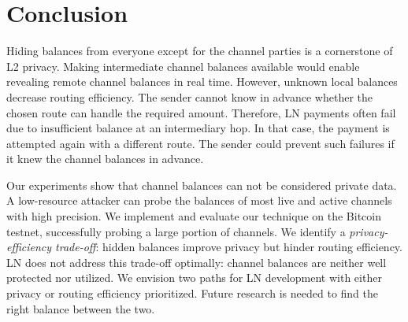 \section{Conclusion} \label{sec:conclusion}

Hiding balances from everyone except for the channel parties is a cornerstone of L2 privacy.
Making intermediate channel balances available would enable revealing remote channel balances in real time.
However, unknown local balances decrease routing efficiency.
The sender cannot know in advance whether the chosen route can handle the required amount.
Therefore, LN payments often fail due to insufficient balance at an intermediary hop.
In that case, the payment is attempted again with a different route.
The sender could prevent such failures if it knew the channel balances in advance.

Our experiments show that channel balances can not be considered private data.
A low-resource attacker can probe the balances of most live and active channels with high precision.
We implement and evaluate our technique on the Bitcoin testnet, successfully probing a large portion of channels.
We identify a \textit{privacy-efficiency trade-off}: hidden balances improve privacy but hinder routing efficiency.
LN does not address this trade-off optimally: channel balances are neither well protected nor utilized.
We envision two paths for LN development with either privacy or routing efficiency prioritized.
Future research is needed to find the right balance between the two.
